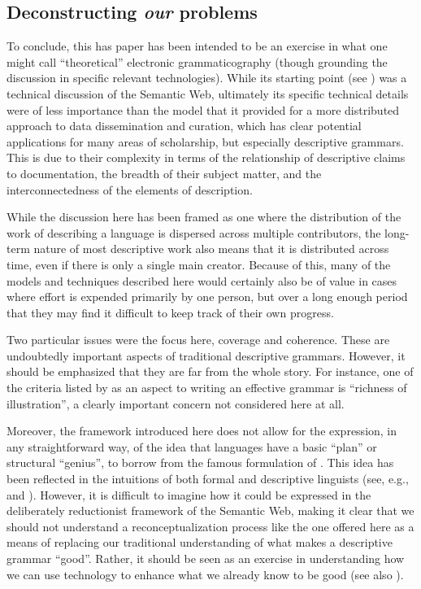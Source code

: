 \subsection{Deconstructing \emph{our} problems\label{Deconstructing}}

To conclude, this has paper has been intended to be an exercise in what one
might call ``theoretical'' electronic grammaticography (though grounding the
discussion in specific relevant technologies). While its starting point (see
) was a technical discussion of the Semantic Web, ultimately its
specific technical details were of less importance than the model that it
provided for a more distributed approach to data dissemination and curation,
which has clear potential applications for many areas of scholarship, but
especially descriptive grammars. This is due to their complexity in terms of the
relationship of descriptive claims to documentation, the breadth of their
subject matter, and the interconnectedness of the elements of description.

While the discussion here has been framed as one where the distribution of the
work of describing a language is dispersed across multiple contributors, the
long-term nature of most descriptive work also means that it is distributed
across time, even if there is only a single main creator. Because of this, many
of the models and techniques described here would certainly also be of value in
cases where effort is expended primarily by one person, but over a long enough
period that they may find it difficult to keep track of their own progress.

Two particular issues were the focus here, coverage and coherence. These are
undoubtedly important aspects of traditional descriptive grammars. However, it
should be emphasized that they are far from the whole story. For instance, one
of the criteria listed by  as an aspect to
writing an effective grammar is ``richness of illustration'', a clearly
important concern not considered here at all.

Moreover, the framework introduced here does not allow for the expression, in
any straightforward way, of the idea that languages have a basic ``plan'' or
structural ``genius'', to borrow from the famous formulation of
\citep[127]{Sapir:1921}. This idea has been reflected in the intuitions of both
formal and descriptive linguists (see, e.g.,  and
). However, it is difficult to imagine how it
could be expressed in the deliberately reductionist framework of the Semantic
Web, making it clear that we should not understand a reconceptualization process
like the one offered here as a means of replacing our traditional understanding
of what makes a descriptive grammar ``good''. Rather, it should be seen as an
exercise in understanding how we can use technology to enhance what we already
know to be good (see also ).


